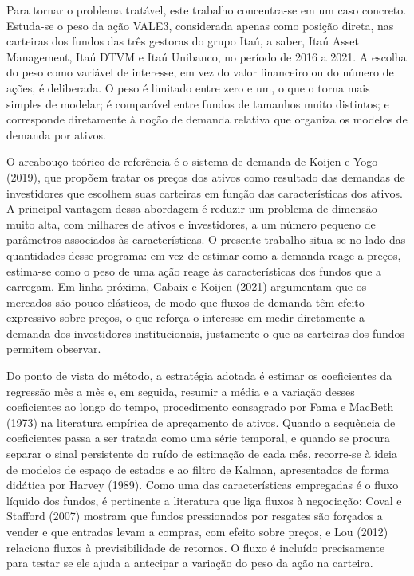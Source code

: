 \documentclass[12pt,a4paper]{article}
\begin{document}
Para tornar o problema tratável, este trabalho concentra-se em um caso concreto. Estuda-se
o peso da ação VALE3, considerada apenas como posição direta, nas carteiras dos fundos das
três gestoras do grupo Itaú, a saber, Itaú Asset Management, Itaú DTVM e Itaú Unibanco, no
período de 2016 a 2021. A escolha do peso como variável de interesse, em vez do valor
financeiro ou do número de ações, é deliberada. O peso é limitado entre zero e um, o que o
torna mais simples de modelar; é comparável entre fundos de tamanhos muito distintos; e
corresponde diretamente à noção de demanda relativa que organiza os modelos de demanda por
ativos.

O arcabouço teórico de referência é o sistema de demanda de Koijen e Yogo (2019), que
propõem tratar os preços dos ativos como resultado das demandas de investidores que escolhem
suas carteiras em função das características dos ativos. A principal vantagem dessa
abordagem é reduzir um problema de dimensão muito alta, com milhares de ativos e
investidores, a um número pequeno de parâmetros associados às características. O presente
trabalho situa-se no lado das quantidades desse programa: em vez de estimar como a demanda
reage a preços, estima-se como o peso de uma ação reage às características dos fundos que a
carregam. Em linha próxima, Gabaix e Koijen (2021) argumentam que os mercados são pouco
elásticos, de modo que fluxos de demanda têm efeito expressivo sobre preços, o que reforça
o interesse em medir diretamente a demanda dos investidores institucionais, justamente o que
as carteiras dos fundos permitem observar.

Do ponto de vista do método, a estratégia adotada é estimar os coeficientes da regressão
mês a mês e, em seguida, resumir a média e a variação desses coeficientes ao longo do tempo,
procedimento consagrado por Fama e MacBeth (1973) na literatura empírica de apreçamento de
ativos. Quando a sequência de coeficientes passa a ser tratada como uma série temporal, e
quando se procura separar o sinal persistente do ruído de estimação de cada mês, recorre-se
à ideia de modelos de espaço de estados e ao filtro de Kalman, apresentados de forma
didática por Harvey (1989). Como uma das características empregadas é o fluxo líquido dos
fundos, é pertinente a literatura que liga fluxos à negociação: Coval e Stafford (2007)
mostram que fundos pressionados por resgates são forçados a vender e que entradas levam a
compras, com efeito sobre preços, e Lou (2012) relaciona fluxos à previsibilidade de
retornos. O fluxo é incluído precisamente para testar se ele ajuda a antecipar a variação do
peso da ação na carteira.
\end{document}
